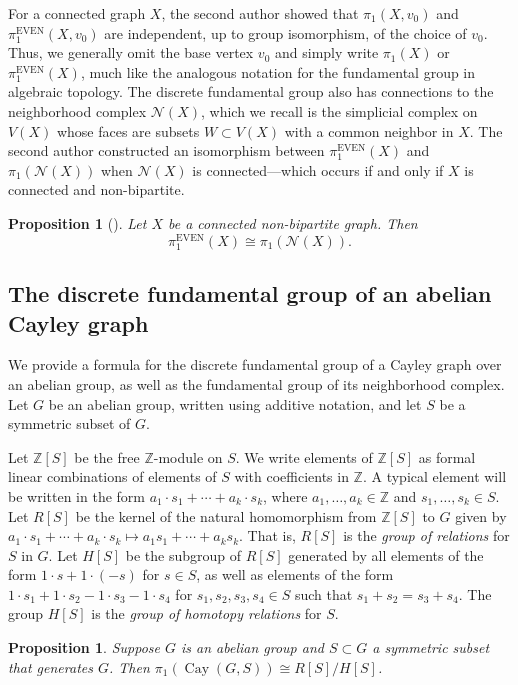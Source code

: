 \documentclass[12pt,letterpaper]{amsart}
\newtheorem{proposition}[theorem]{Proposition}
\theoremstyle{definition}
\theoremstyle{remark}
\newenvironment{prop}{\begin{proposition}}{\end{proposition}}
\newcommand{\N}{{\mathcal N}}
\newcommand{\pieven}{\pi_1^{\mathrm{EVEN}}}
\DeclareMathOperator{\Cay}{Cay}
\begin{document}
For a connected graph $X$, the second author \cite{San} showed that $\pi_1(X,v_0)$ and $\pieven(X,v_0)$ are independent, up to group isomorphism, of the choice of $v_0$. Thus, we generally omit the base vertex $v_0$ and simply write $\pi_1(X)$ or $\pieven(X)$, much like the analogous notation for the fundamental group in algebraic topology. 
The discrete fundamental group also has connections to the neighborhood complex $\N(X)$, which we recall is the simplicial complex on $V(X)$ whose faces are subsets $W\subset V(X)$ with a common neighbor in $X$. The second author constructed an isomorphism between $\pieven(X)$ and $\pi_1(\N(X))$ when $\N(X)$ is connected---which occurs if and only if $X$ is connected and non-bipartite.
\begin{prop}[{\cite[Prop. 6.3]{San}}]\label{prop:pi1even}Let $X$ be a connected non-bipartite graph.  Then \[\pieven(X)\cong \pi_1(\mathcal{N}(X)).\]
\end{prop}



\subsection{The discrete fundamental group of an abelian Cayley graph} 
\label{sec:compute-pi1}
We provide a formula for the discrete fundamental group of a Cayley graph over an abelian group, as well as the fundamental group of its neighborhood complex. Let $G$ be an abelian group, written using additive notation, and let $S$ be a symmetric subset of $G$.


Let $\mathbb{Z}[S]$ be the free $\mathbb Z$-module on $S$. We write elements of $\mathbb{Z}[S]$ as formal linear combinations of elements of $S$ with coefficients in $\mathbb{Z}$. A typical element will be written in the form $a_1\cdot s_1+\cdots+ a_k\cdot s_k$, where $a_1,\dots,a_k\in\mathbb{Z}$ and $s_1,\dots,s_k\in S$.  Let $R[S]$ be the kernel of the natural homomorphism from $\mathbb{Z}[S]$ to $G$ given by $a_1\cdot s_1+\cdots+ a_k\cdot s_k\mapsto a_1 s_1+\cdots+ a_k s_k$.  That is, $R[S]$ is the \emph{group of relations} for $S$ in $G$. Let $H[S]$ be the subgroup of $R[S]$ generated by all elements of the form $1\cdot s+1\cdot (-s)$ for $s\in S$, as well as elements of the form $1\cdot s_1+1\cdot s_2-1\cdot s_3-1\cdot s_4$ for $s_1, s_2, s_3, s_4\in S$ such that $s_1+s_2=s_3+s_4$. The group $H[S]$ is the \emph{group of homotopy relations} for $S$.

\begin{proposition}\label{prop:pi1-for-abelian-Cayley-graph}
Suppose $G$ is an abelian group and $S\subset G$ a symmetric subset that generates $G$. Then $\pi_1(\Cay(G,S))\cong R[S]/H[S]$.
\end{proposition}
\end{document}
